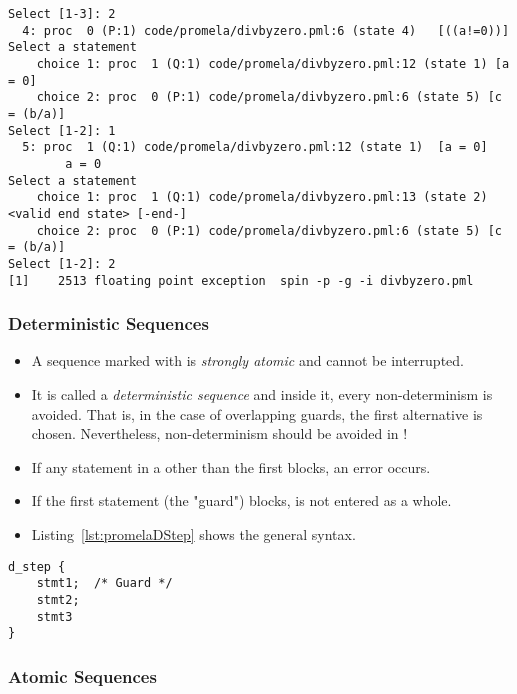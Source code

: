 \begin{itemize}
\begin{lstlisting}[numbers = none]
Select [1-3]: 2
  4: proc  0 (P:1) code/promela/divbyzero.pml:6 (state 4)	[((a!=0))]
Select a statement
	choice 1: proc  1 (Q:1) code/promela/divbyzero.pml:12 (state 1) [a = 0]
	choice 2: proc  0 (P:1) code/promela/divbyzero.pml:6 (state 5) [c = (b/a)]
Select [1-2]: 1
  5: proc  1 (Q:1) code/promela/divbyzero.pml:12 (state 1)	[a = 0]
		a = 0
Select a statement
	choice 1: proc  1 (Q:1) code/promela/divbyzero.pml:13 (state 2) <valid end state> [-end-]
	choice 2: proc  0 (P:1) code/promela/divbyzero.pml:6 (state 5) [c = (b/a)]
Select [1-2]: 2
[1]    2513 floating point exception  spin -p -g -i divbyzero.pml
					\end{lstlisting}
			\end{itemize}
		
			

			\subsubsection{Deterministic Sequences}
				\begin{itemize}
					\item A sequence marked with  is \textit{strongly atomic} and cannot be interrupted.
					\item It is called a \textit{deterministic sequence} and inside it, every non-determinism is avoided. That is, in the case of overlapping guards, the first alternative is chosen. Nevertheless, non-determinism should be avoided in !
					\item If any statement in a  other than the first blocks, an error occurs.
					\item If the first statement (the "guard") blocks,  is not entered as a whole.
					\item Listing~\ref{lst:promelaDStep} shows the general syntax.
				\end{itemize}
			
				\begin{lstlisting}[caption = { Deterministic Sequence in PROMELA }, label = ls:promelaDStep, language = PROMELA]
d_step {
	stmt1;  /* Guard */
	stmt2;
	stmt3
}
				\end{lstlisting}

			\subsubsection{Atomic Sequences}
				\label{sec:atomic}
			
